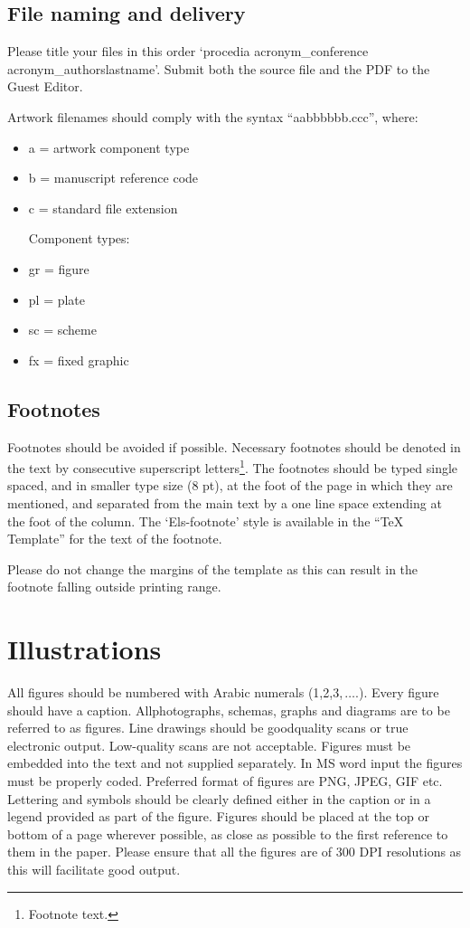 \documentclass[3p,times,procedia]{elsarticle}
\begin{document}
\subsection{File naming and delivery}
Please title your files in this order `procedia acronym\_conference acronym\_authorslastname'.  Submit both the source file and the PDF to the Guest Editor.

Artwork filenames should comply with the syntax ``aabbbbbb.ccc'', where:
\begin{itemize}
\item a = artwork component type
\item b = manuscript reference code
\item c = standard file extension

Component types:
\item gr = figure
\item pl = plate
\item sc = scheme
\item fx = fixed graphic
\end{itemize}


\subsection{Footnotes}
Footnotes should be avoided if possible. Necessary footnotes should be denoted in the text by consecutive superscript letters\footnote{Footnote text.}. The footnotes should be typed single spaced, and in smaller type size (8 pt), at the foot of the page in which they are mentioned, and separated from the main text by a one line space extending at the foot of the column. The `Els-footnote' style is available in the ``TeX Template'' for the text of the footnote.

Please do not change the margins of the template as this can result in the footnote falling outside printing range.


\section{Illustrations}
All figures should be numbered with Arabic numerals (1,2,3,$\,\ldots.$). Every figure should have a caption. All\break photographs, schemas, graphs and diagrams are to be referred to as figures. Line drawings should be good\break quality scans or true electronic output. Low-quality scans are not acceptable. Figures must be embedded into the text and not supplied separately. In MS word input the figures must be properly coded. Preferred format of figures are PNG, JPEG, GIF etc. Lettering and symbols should be clearly defined either in the caption or in a legend provided as part of the figure. Figures should be placed at the top or bottom of a page wherever possible, as close as possible to the first reference to them in the paper. Please ensure that all the figures are of 300 DPI resolutions as this will facilitate good output.
\end{document}

